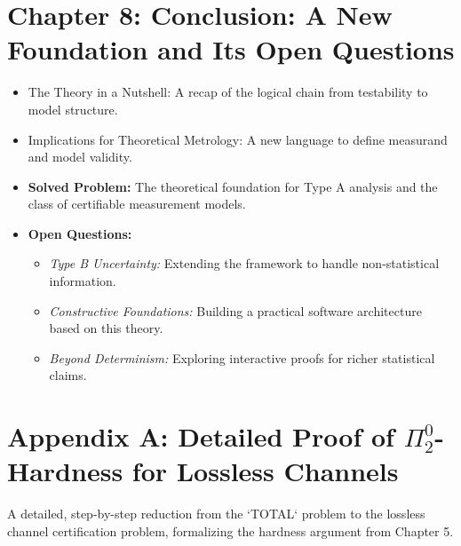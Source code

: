 \documentclass[12pt]{article}
\begin{document}
\section*{Chapter 8: Conclusion: A New Foundation and Its Open Questions}
\begin{itemize}
    \item The Theory in a Nutshell: A recap of the logical chain from testability to model structure.
    \item Implications for Theoretical Metrology: A new language to define measurand and model validity.
    \item \textbf{Solved Problem:} The theoretical foundation for Type A analysis and the class of certifiable measurement models.
    \item \textbf{Open Questions:}
    \begin{itemize}
        \item \emph{Type B Uncertainty:} Extending the framework to handle non-statistical information.
        \item \emph{Constructive Foundations:} Building a practical software architecture based on this theory.
        \item \emph{Beyond Determinism:} Exploring interactive proofs for richer statistical claims.
    \end{itemize}
\end{itemize}

\appendix
\section*{Appendix A: Detailed Proof of $\Pi^0_2$-Hardness for Lossless Channels}
A detailed, step-by-step reduction from the `TOTAL` problem to the lossless channel certification problem, formalizing the hardness argument from Chapter 5.
\end{document}
